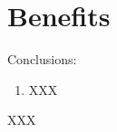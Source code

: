 \section{Benefits}

 \begin{frame}[c]{Conclusions:}
    \begin{enumerate}
        \item XXX
    \end{enumerate}
    XXX
\end{frame}
